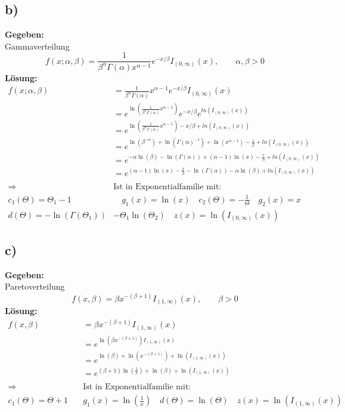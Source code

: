 \documentclass{article}
\begin{document}
\subsection*{b)}
\textbf{Gegeben:}\\

Gammaverteilung
\[f(x; \alpha, \beta) = \frac{1}{\beta^{\alpha} \Gamma(\alpha)x^{\alpha-1}} e^{-x/\beta}I_{(0, \infty)}(x), \qquad \alpha, \beta > 0\]
\textbf{Lösung:}
\begin{align*}
    f(x; \alpha, \beta) &= \frac{1}{\beta^{\alpha} \Gamma(\alpha)}x^{\alpha-1} e^{-x/\beta}I_{(0, \infty)}(x) \\ 
    &= e^{\ln(\frac{1}{\beta^{\alpha} \Gamma(\alpha)}x^{\alpha-1})} e^{-x/\beta} e^{ln(I_{(0, \infty)}(x))} \\
    &= e^{\ln(\frac{1}{\beta^{\alpha} \Gamma(\alpha)}x^{\alpha-1})-x/\beta + ln(I_{(0, \infty)}(x))} \\
    &= e^{\ln(\beta^{-\alpha}) + \ln(\Gamma(\alpha)^{-1}) + \ln(x^{\alpha-1}) - \frac{x}{\beta} +ln(I_{(0, \infty)}(x))} \\
    &= e^{-\alpha\ln(\beta) - \ln(\Gamma(\alpha)) + (\alpha -1 )\ln(x)  - \frac{x}{\beta} +ln(I_{(0, \infty)}(x))} \\
    &= e^{(\alpha- 1)\ln(x) - \frac{x}{\beta} - \ln(\Gamma(\alpha)) - \alpha\ln(\beta) + ln(I_{(0, \infty)}(x))} \\ \\
    \Longrightarrow ~ &\text{Ist in Exponentialfamilie mit:} \\
    c_1(\Theta) = \Theta_1 - 1 &\quad g_1(x) = \ln(x) \quad c_2(\Theta) = -\frac{1}{\Theta} \quad g_2(x) = x \\
    d(\Theta) = - \ln(\Gamma(\Theta_1)) &- \Theta_1 \ln(\Theta_2) \quad z(x) = \ln(I_{(0,\infty)}(x))
\end{align*}
\subsection*{c)}
\textbf{Gegeben:}\\

Paretoverteilung
\[f(x, \beta) = \beta x^{-(\beta + 1)} I_{(1, \infty)}(x), \qquad \beta > 0\]
\textbf{Lösung:}
\begin{align*}
    f(x, \beta) &= \beta x^{-(\beta + 1)} I_{(1, \infty)}(x) \\
    &= e^{\ln(\beta x^{-(\beta +1 )})I_{(1, \infty)}(x)}\\
    &= e^{\ln(\beta)+ \ln(x^{-(\beta+1)}) + \ln(I_{(1, \infty)}(x))} \\
    &= e^{(\beta+1)\ln(\frac{1}{x})+ \ln(\beta) +\ln(I_{(1, \infty)}(x))} \\ \\
    \Longrightarrow ~ &\text{Ist in Exponentialfamilie mit:} \\
    c_1(\Theta) = \Theta + 1 \quad & g_1(x) = \ln(\frac{1}{x}) \quad d(\Theta) = \ln(\Theta) \quad z(x) = \ln(I_{(1, \infty)}(x))
\end{align*}
\end{document}
